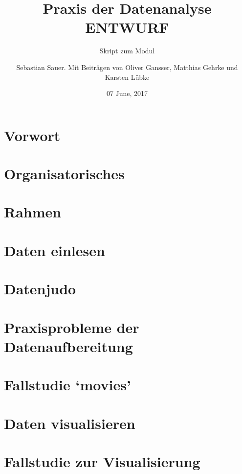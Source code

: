 \documentclass[12pt,ngerman,]{book}
\title{Praxis der Datenanalyse ENTWURF}
\subtitle{Skript zum Modul}
\author{Sebastian Sauer. Mit Beiträgen von Oliver Gansser, Matthias Gehrke und
Karsten Lübke}
\date{07 June, 2017}
\begin{document}
\maketitle

{
\hypersetup{linkcolor=black}
\setcounter{tocdepth}{2}
\tableofcontents
}
\listoftables
\listoffigures
\chapter*{Vorwort}\label{vorwort}


\chapter{Organisatorisches}\label{organisatorisches}

\chapter{Rahmen}\label{rahmen}

\chapter{Daten einlesen}\label{daten-einlesen}

\chapter{Datenjudo}\label{datenjudo}

\chapter{Praxisprobleme der
Datenaufbereitung}\label{praxisprobleme-der-datenaufbereitung}

\chapter{\texorpdfstring{Fallstudie
`movies'}{Fallstudie movies}}\label{case-movies}

\chapter{Daten visualisieren}\label{daten-visualisieren}

\chapter{Fallstudie zur
Visualisierung}\label{fallstudie-zur-visualisierung}
\end{document}
